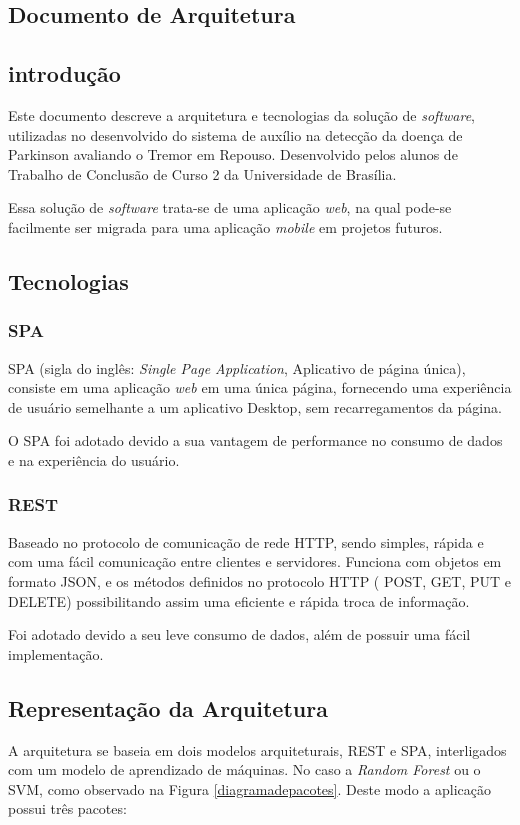 \begin{anexosenv}

    \partanexos
    \chapter{Documento de Arquitetura}
    \label{adoarquitetura}
    \section{introdução}
    Este documento descreve a arquitetura e tecnologias da solução de \textit{software}, utilizadas no desenvolvido do sistema de auxílio na detecção da doença de Parkinson avaliando o Tremor em Repouso. Desenvolvido pelos alunos de Trabalho de Conclusão de Curso 2 da Universidade de Brasília.

    Essa solução de \textit{software} trata-se de uma aplicação \textit{web}, na qual pode-se facilmente ser migrada para uma aplicação \textit{mobile} em projetos futuros.

    \section{Tecnologias}
    \subsection{SPA}
    SPA (sigla do inglês: \textit{Single Page Application}, Aplicativo de página única), consiste em uma aplicação \textit{web} em uma única página, fornecendo uma experiência de usuário semelhante a um aplicativo Desktop, sem recarregamentos da página.

   O SPA foi adotado devido a sua vantagem de performance no consumo de dados e na experiência do usuário.

    \subsection{REST}
    Baseado no protocolo de comunicação de rede HTTP, sendo simples, rápida e com uma fácil comunicação entre clientes e servidores. Funciona com objetos em formato JSON, e os métodos definidos no protocolo HTTP ( POST, GET, PUT e DELETE) possibilitando assim uma eficiente e rápida troca de informação.

   Foi adotado devido a seu leve consumo de dados, além de possuir uma fácil implementação.

    \section{Representação da Arquitetura}
    A arquitetura se baseia em dois modelos arquiteturais, REST e SPA, interligados com um modelo de aprendizado de máquinas. No caso a \textit{Random Forest} ou o SVM, como observado na Figura \ref{diagramadepacotes}. Deste modo a aplicação possui três pacotes:


\end{anexosenv}
